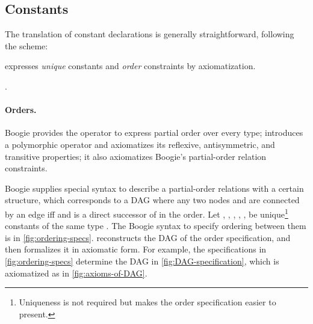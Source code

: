 \documentclass[a4paper,final]{llncs}
\makeatletter
\newif\iflong
\newcommand{\Boogie}{Boogie\xspace}
\newcommand{\tightParagraph}[1]{\paragraph{#1}}
\newcommand\tightParagraph{\@startsection{paragraph}{4}{\z@}{-5\p@ \@plus -4\p@ \@minus -4\p@}{-0.5em \@plus -0.22em \@minus -0.1em}{\normalfont\normalsize\itshape}}
\newcommand{\feature}[1]{\subsection{#1}}
\makeatother
\begin{document}
\feature{Constants}

The translation of constant declarations is generally straightforward, following the scheme:
\begin{center}
 
\end{center}
\iflong
\else
 expresses \emph{unique} constants and \emph{order} constraints by axiomatization.
\fi

\iflong
\tightParagraph{Unique constants.}
All constants of a type \B{T} declared with the modifier \B{unique} have values that are pairwise different.
Thus, for  constants \B{const unique c, , c: T},  encodes the uniqueness properties using  axioms\iflong , for \fi.


\tightParagraph{Orders.}
\Boogie provides the operator \B{<:} to express partial order over every type;  introduces a polymorphic operator \W{<:} and axiomatizes its reflexive, antisymmetric, and transitive properties\iflong:\else; it also axiomatizes \Boogie's partial-order relation constraints.\fi

\iflong
\begin{why3}[numbers=none]
predicate (<:) (x: 'a) (y: 'a)
axiom ReflexivePO:     forall x: 'a     . x <: x
axiom AntisymmetricPO: forall x y: 'a   . x <: y && y <: x -> x = y
axiom TransitivePO:    forall x y z: 'a . x <: y && y <: z -> x <: z
\end{why3}
\fi

\iflong
\Boogie supplies special syntax to describe a partial-order relations with a certain structure, which corresponds to a DAG where any two nodes  and  are connected by an edge  iff  and  is a direct successor of  in the order.
Let , , , , ,  be unique\footnote{Uniqueness is not required but makes the order specification easier to present.} constants of the same type .
The \Boogie syntax to specify ordering between them is in \autoref{fig:ordering-specs}.
 reconstructs the DAG of the order specification, and then formalizes it in axiomatic form.
For example, the specifications in \autoref{fig:ordering-specs} determine the DAG in \autoref{fig:DAG-specification}, which is axiomatized as in \autoref{fig:axioms-of-DAG}.
\end{document}
